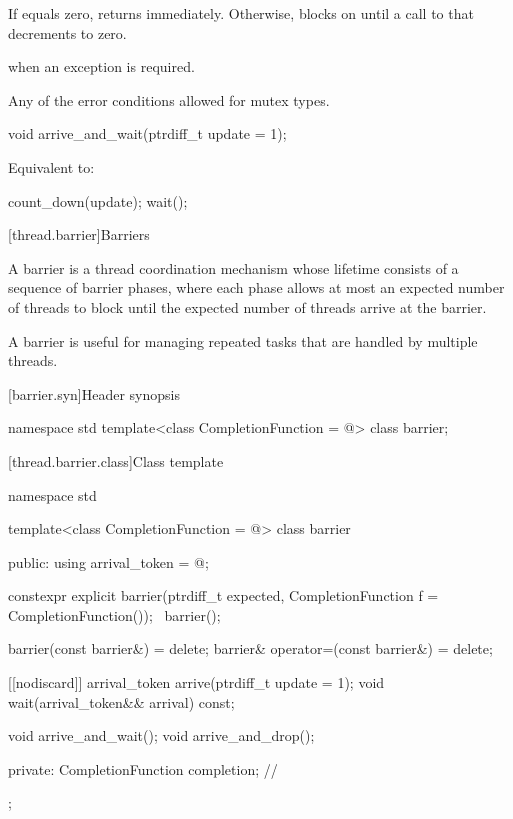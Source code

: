 \begin{itemdescr}
\pnum
\effects
If  equals zero, returns immediately.
Otherwise, blocks on 
until a call to  that decrements  to zero.

\pnum
\throws
{} when an exception is required.

\pnum
\errors
Any of the error conditions
allowed for mutex types.
\end{itemdescr}

%
\begin{itemdecl}
void arrive_and_wait(ptrdiff_t update = 1);
\end{itemdecl}

\begin{itemdescr}
\pnum
\effects
Equivalent to:
\begin{codeblock}
count_down(update);
wait();
\end{codeblock}
\end{itemdescr}

[thread.barrier]{Barriers}

\pnum
A barrier is a thread coordination mechanism
whose lifetime consists of a sequence of barrier phases,
where each phase allows at most an expected number of threads to block
until the expected number of threads arrive at the barrier.
\begin{note}
A barrier is useful for managing repeated tasks
that are handled by multiple threads.
\end{note}

[barrier.syn]{Header  synopsis}

%
\begin{codeblock}
namespace std {
  template<class CompletionFunction = @\seebelow@>
    class barrier;
}
\end{codeblock}

[thread.barrier.class]{Class template }

\begin{codeblock}
namespace std {
  template<class CompletionFunction = @\seebelow@>
  class barrier {
  public:
    using arrival_token = @\seebelow@;

    constexpr explicit barrier(ptrdiff_t expected,
                               CompletionFunction f = CompletionFunction());
    ~barrier();

    barrier(const barrier&) = delete;
    barrier& operator=(const barrier&) = delete;

    [[nodiscard]] arrival_token arrive(ptrdiff_t update = 1);
    void wait(arrival_token&& arrival) const;

    void arrive_and_wait();
    void arrive_and_drop();

  private:
    CompletionFunction completion;      // \expos
  };
}
\end{codeblock}

